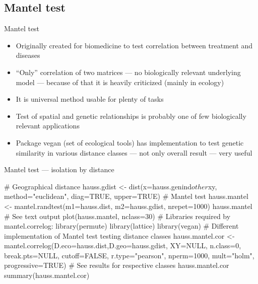 \documentclass[compress, ucs, xelatex, 11pt, xcolor=svgnames,
  hyperref={
    bookmarks=true,
    unicode=true,
    colorlinks=true,
    pdftitle={Molecular data in R},
    plainpages=false,
    pdfauthor={Vojtech Zeisek},
    pdfsubject={Course about phylogeny and evolution in R},
    pdfcreator={XeLaTeX},
    pdfkeywords={R, evolution, phylogeny, molecular data},
    linkcolor=Tomato,
    anchorcolor=SaddleBrown,
    citecolor=Goldenrod,
    filecolor=DarkMagenta,
    menucolor=Sienna,
    urlcolor=DarkTurquoise,
    pdftex},
  url={hyphens, lowtilde} %
  ]{beamer}
\begin{document}
\subsection{Mantel test}

\begin{frame}{Mantel test}
  \begin{itemize}
    \item Originally created for biomedicine to test correlation between treatment and diseases
    \item ``Only'' correlation of two matrices --- no biologically relevant underlying model --- because of that it is heavily criticized (mainly in ecology)
    \item It is universal method usable for plenty of tasks
    \item Test of spatial and genetic relationships is probably one of few biologically relevant applications
    \item Package vegan (set of ecological tools) has implementation to test genetic similarity in various distance classes --- not only overall result --- very useful
  \end{itemize}
\end{frame}

\begin{frame}[fragile]{Mantel test --- isolation by distance}
  \begin{spluscode}
    # Geographical distance
    hauss.gdist <- dist(x=hauss.genind$other$xy, method="euclidean",
      diag=TRUE, upper=TRUE)
    # Mantel test
    hauss.mantel <- mantel.randtest(m1=hauss.dist, m2=hauss.gdist,
      nrepet=1000)
    hauss.mantel # See text output
    plot(hauss.mantel, nclass=30)
    # Libraries required by mantel.correlog:
    library(permute)
    library(lattice)
    library(vegan)
    # Different implementation of Mantel test testing distance classes
    hauss.mantel.cor <- mantel.correlog(D.eco=hauss.dist,D.geo=hauss.gdist,
      XY=NULL, n.class=0, break.pts=NULL, cutoff=FALSE, r.type="pearson",
      nperm=1000, mult="holm", progressive=TRUE)
    # See results for respective classes
    hauss.mantel.cor
    summary(hauss.mantel.cor)
  \end{spluscode}
\end{frame}
\end{document}
